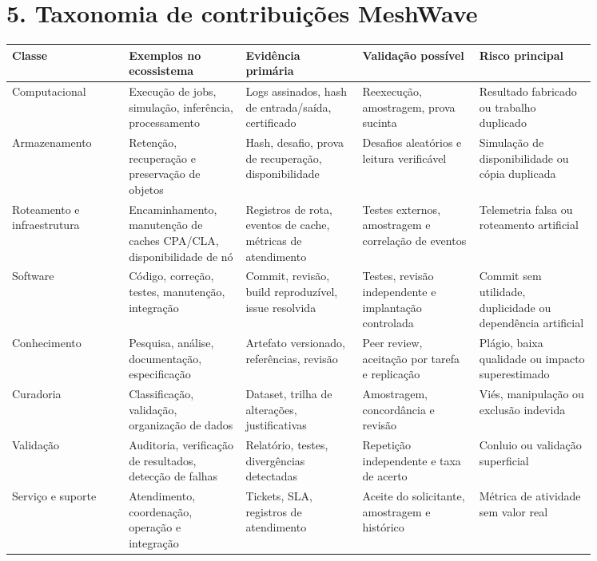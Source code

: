 \documentclass[12pt,a4paper]{article}
\begin{document}
\section{5. Taxonomia de contribuições MeshWave}

\begin{center}
\small
\begin{longtable}{p{0.17\linewidth} p{0.17\linewidth} p{0.17\linewidth} p{0.17\linewidth} p{0.17\linewidth}}
\toprule
Classe & Exemplos no ecossistema & Evidência primária & Validação possível & Risco principal \\
\midrule\endhead
Computacional & Execução de jobs, simulação, inferência, processamento & Logs assinados, hash de entrada/saída, certificado & Reexecução, amostragem, prova sucinta & Resultado fabricado ou trabalho duplicado \\
Armazenamento & Retenção, recuperação e preservação de objetos & Hash, desafio, prova de recuperação, disponibilidade & Desafios aleatórios e leitura verificável & Simulação de disponibilidade ou cópia duplicada \\
Roteamento e infraestrutura & Encaminhamento, manutenção de caches CPA/CLA, disponibilidade de nó & Registros de rota, eventos de cache, métricas de atendimento & Testes externos, amostragem e correlação de eventos & Telemetria falsa ou roteamento artificial \\
Software & Código, correção, testes, manutenção, integração & Commit, revisão, build reproduzível, issue resolvida & Testes, revisão independente e implantação controlada & Commit sem utilidade, duplicidade ou dependência artificial \\
Conhecimento & Pesquisa, análise, documentação, especificação & Artefato versionado, referências, revisão & Peer review, aceitação por tarefa e replicação & Plágio, baixa qualidade ou impacto superestimado \\
Curadoria & Classificação, validação, organização de dados & Dataset, trilha de alterações, justificativas & Amostragem, concordância e revisão & Viés, manipulação ou exclusão indevida \\
Validação & Auditoria, verificação de resultados, detecção de falhas & Relatório, testes, divergências detectadas & Repetição independente e taxa de acerto & Conluio ou validação superficial \\
Serviço e suporte & Atendimento, coordenação, operação e integração & Tickets, SLA, registros de atendimento & Aceite do solicitante, amostragem e histórico & Métrica de atividade sem valor real \\

\end{longtable}
\end{center}
\end{document}
